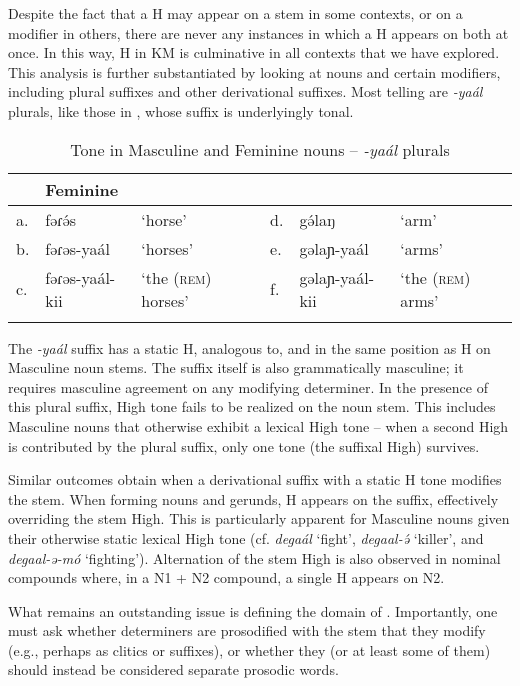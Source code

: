 \documentclass[output=paper,colorlinks,citecolor=brown]{langscibook}
\begin{document}
Despite the fact that a H may appear on a stem in some contexts, or on a modifier in others, there are never any instances in which a H appears on both at once. In this way, H in KM is  culminative in all contexts that we have explored. This analysis is further substantiated by looking at nouns and certain modifiers, including plural suffixes and other derivational suffixes. Most telling are \textit{-yaál} plurals, like those in , whose suffix is underlyingly tonal. 

\begin{table} 
\small
\caption{Tone in Masculine and Feminine nouns -- \textit{-yaál} plurals}
\label{tab:MFYaal}
 \begin{tabular}{llllll}
  \lsptoprule
  \multicolumn{3}{l}{Masculine}  & \multicolumn{3}{l}{Feminine}\\
  \midrule
a. & fəɾə́s & `horse' & d. &gə́laŋ & `arm' \\
b.&fəɾəs-yaál & `horses' &e.& gəlaɲ-yaál& `arms' \\
c.&fəɾəs-yaál-kii & `the (\textsc{rem}) horses' & f.&gəlaɲ-yaál-kii & `the (\textsc{rem}) arms' \\
  \lspbottomrule
 \end{tabular}
\end{table}

The \textit{-yaál} suffix has a static H, analogous to, and in the same position as H on Masculine noun stems. The suffix itself is also grammatically masculine; it requires masculine agreement on any modifying determiner. In the presence of this plural suffix, High tone fails to be realized on the noun stem. This includes Masculine nouns that otherwise exhibit a lexical High tone -- when a second High is contributed by the plural  suffix, only one tone (the suffixal High) survives.

Similar outcomes obtain when a derivational suffix with a static H tone modifies the stem. When forming  nouns and gerunds, H appears on the suffix, effectively overriding the stem High. This is particularly apparent for Masculine nouns given their otherwise static lexical High tone (cf. \textit{degaál} `fight', \textit{degaal-ə́} `killer', and \textit{degaal-ə-mó} `fighting'). Alternation of the stem High is also observed in nominal compounds where, in a N1 + N2  compound, a single H appears on N2. 

What remains an outstanding issue is defining the domain of . Importantly, one must ask whether determiners are prosodified with the stem that they modify (e.g., perhaps as clitics or suffixes), or whether they (or at least some of them) should instead be considered separate  prosodic words.
\end{document}
